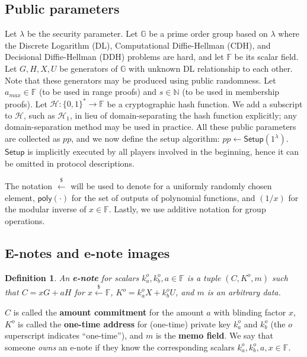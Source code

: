 \documentclass{article}
\newtheorem{definition}{Definition}[section]
\begin{document}
\subsection{Public parameters}
Let $\lambda$ be the security parameter. Let $\mathbb{G}$ be a prime order group based on $\lambda$ where the Discrete Logarithm (DL), Computational Diffie-Hellman (CDH), and Decisional Diffie-Hellman (DDH) problems are hard, and let $\mathbb{F}$ be its scalar field. Let $G, H, X, U$ be generators of $\mathbb{G}$ with unknown DL relationship to each other. Note that these generators may be produced using public randomness. Let $a_{max}\in\mathbb{F}$ (to be used in range proofs) and $s\in\mathbb{N}$ (to be used in membership proofs). Let $\mathcal{H}:\{0,1\}^*\rightarrow\mathbb{F}$ be a cryptographic hash function. We add a subscript to $\mathcal{H}$, such as $\mathcal{H}_1$, in lieu of domain-separating the hash function explicitly; any domain-separation method may be used in practice. All these public parameters are collected as $pp$, and we now define the setup algorithm: $pp\leftarrow\textsf{Setup}(1^{\lambda})$. $\textsf{Setup}$ is implicitly executed by all players involved in the beginning, hence it can be omitted in protocol descriptions.

The notation $\xleftarrow{\$}$ will be used to denote for a uniformly randomly chosen element, $\textsf{poly}(\cdot)$ for the set of outputs of polynomial functions, and $(1/x)$ for the modular inverse of $x\in\mathbb{F}$. Lastly, we use additive notation for group operations.

\subsection{E-notes and e-note images}
\begin{definition}\label{e-note}
An \textbf{\em e-note} for scalars $k_a^o, k_b^o, a \in\mathbb{F}$ is a tuple $(C, K^o, m)$ such that $C = x G + a H$ for $x\xleftarrow{\$}\mathbb{F}$, $K^o=k_a^o X + k_b^o U$, and $m$ is an arbitrary data.
\end{definition}
$C$ is called the \textbf{amount commitment} for the amount $a$ with blinding factor $x$, $K^o$ is called the \textbf{one-time address} for (one-time) private key $k_a^o$ and $k_b^o$ (the $o$ superscript indicates ``one-time''), and $m$ is the \textbf{memo field}. We say that someone \textit{owns} an e-note if they know the corresponding scalars $k_a^o, k_b^o, a, x \in\mathbb{F}$.
\end{document}
